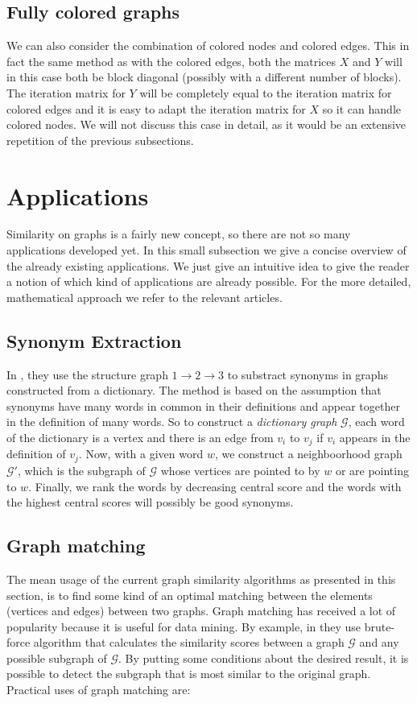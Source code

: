 \documentclass[a4paper,11pt]{report}
\newcommand{\graf}{\mathscr{G}}
\begin{document}
\subsection{Fully colored graphs}
We can also consider the combination of colored nodes and colored edges. This in 
fact the same method as with the colored edges, both the matrices $X$ and $Y$ 
will in this case both be block diagonal (possibly with a different number of 
blocks). The iteration matrix for $Y$ will be completely equal to the iteration 
matrix for colored edges and it is easy to adapt the iteration matrix for $X$ so it can handle colored nodes. 
We will not discuss this case in detail, as it would 
be an extensive repetition of the previous subsections.
\newpage
\section{Applications}
Similarity on graphs is a fairly new concept, so there are not so many 
applications developed yet. In this small subsection we give a concise overview 
of the already existing applications. We just give an intuitive idea to give the 
reader a notion of which kind of applications are already possible. For the more 
detailed, mathematical approach we refer to the relevant articles.
\subsection{Synonym Extraction}
In \cite{blondel}, they use the structure graph $1 \to 2 \to 3$ to substract 
synonyms in graphs constructed from a dictionary. The method is based on the 
assumption that synonyms have many words in common in their definitions and 
appear together in the definition of many words. So to construct a \emph{dictionary 
graph} $\graf$, each word of the dictionary is a vertex 
and there is an edge from $v_i$ to $v_j$ if $v_i$ appears in the definition of 
$v_j$. Now, with a given word $w$, we construct a neighboorhood graph $\graf'$, 
which is the subgraph of $\graf$ whose vertices are pointed to by $w$ or are 
pointing to $w$. Finally, we rank the words by decreasing central score and the 
words with the highest central scores will possibly be good synonyms.
\subsection{Graph matching}
The mean usage of the current graph similarity algorithms as presented in this 
section, is to find some kind of an optimal matching between the elements (vertices and edges) 
between two graphs. Graph matching has received a lot of popularity because it is 
useful for data mining. By example, in \cite{zager} they use brute-force 
algorithm that calculates the similarity scores between a graph $\graf$ and any 
possible subgraph of $\graf$. By putting some conditions about the desired 
result, it is possible to detect the subgraph that is most similar to the 
original graph. Practical uses of graph matching are:
\end{document}
